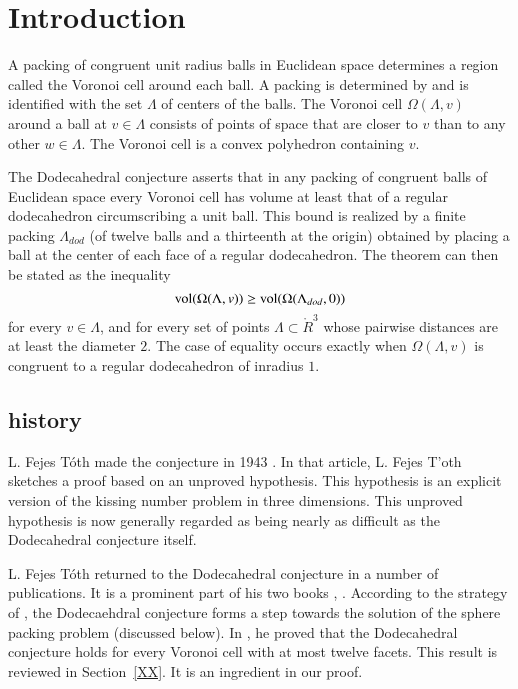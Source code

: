 
\section{Introduction}


\label{sec:dodec}

A packing of congruent unit radius balls 
in Euclidean space determines a region called the Voronoi cell 
around each ball.  
A packing is determined by and is identified  with the set $\Lambda$ of centers of the balls.  The Voronoi
cell $\Omega(\Lambda,v)$ around a ball at $v\in \Lambda$ 
consists of points of space that are closer to $v$ than
to any other $w\in\Lambda$.  The Voronoi cell is a
convex polyhedron containing $v$.

The Dodecahedral conjecture asserts that in any packing of congruent balls of Euclidean
space every Voronoi cell has volume at least that of a regular dodecahedron
circumscribing a unit ball.    This bound is realized by a finite 
packing $\Lambda_{dod}$
(of twelve balls and a thirteenth  at the origin) obtained
by placing a ball at the center of each face of a regular dodecahedron.  The
theorem can then be stated as the inequality
  $$
  {\operatorname{vol}}(\Omega(\Lambda,v)) \ge {\operatorname{vol}}(\Omega(\Lambda_{dod},0))
  $$
for every $v\in\Lambda$, and for every set of points $\Lambda\subset \ring{R}^3$
whose pairwise distances are at least the diameter $2$.
The case of equality occurs exactly when $\Omega(\Lambda,v)$ is
congruent to a regular dodecahedron of inradius $1$.



\subsection{history}


L. Fejes T\'oth made the conjecture in 1943 \cite{Toth1}.  
In that article, L. Fejes
T'oth sketches a proof based on an unproved hypothesis.  This
hypothesis is an explicit version of the kissing number problem
in three dimensions.   This unproved hypothesis
is now generally regarded as being 
nearly as difficult as the  Dodecahedral conjecture itself.  

L. Fejes T\'oth returned to the Dodecahedral conjecture in a number
of publications.  It is a prominent part of his two books \cite{Fej72},
\cite{Toth2}.  According to the strategy of \cite{Fej72}, 
the Dodecaehdral conjecture forms a
step towards the solution of the sphere packing problem
(discussed below).   In \cite{Toth2}, he proved that the Dodecahedral conjecture
holds for every Voronoi cell with at most twelve facets.  
This result is reviewed in Section~\ref{XX}.  It
is an ingredient in our proof. 

